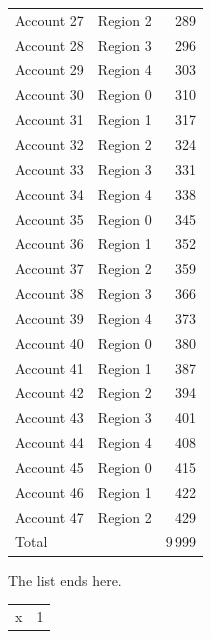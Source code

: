 \documentclass[11pt,a4paper]{article}
\begin{document}
\begin{longtable}{p{4cm} l r}
Account 27 & Region 2 & 289 \\
Account 28 & Region 3 & 296 \\
Account 29 & Region 4 & 303 \\
Account 30 & Region 0 & 310 \\
Account 31 & Region 1 & 317 \\
Account 32 & Region 2 & 324 \\
Account 33 & Region 3 & 331 \\
Account 34 & Region 4 & 338 \\
Account 35 & Region 0 & 345 \\
Account 36 & Region 1 & 352 \\
Account 37 & Region 2 & 359 \\
Account 38 & Region 3 & 366 \\
Account 39 & Region 4 & 373 \\
Account 40 & Region 0 & 380 \\
Account 41 & Region 1 & 387 \\
Account 42 & Region 2 & 394 \\
Account 43 & Region 3 & 401 \\
Account 44 & Region 4 & 408 \\
Account 45 & Region 0 & 415 \\
Account 46 & Region 1 & 422 \\
Account 47 & Region 2 & 429 \\
\addlinespace
Total & & 9\,999 \\
\end{longtable}

The list ends here.\label{lt:end}

\begin{longtable}{lr}
\addlinespace[6pt]
\endhead
x & 1 \\
\end{longtable}
\end{document}
